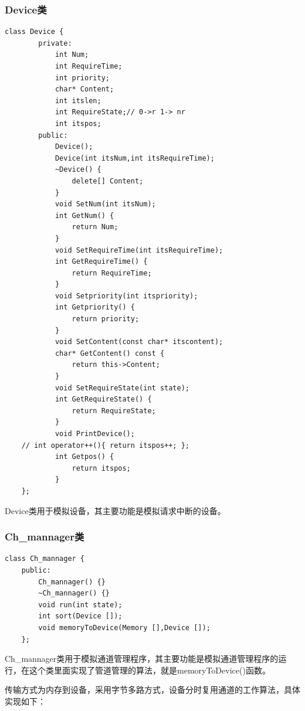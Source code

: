 \documentclass[UTF8,12pt]{article}
\begin{document}
\subsubsection{Device类}
\begin{lstlisting}[frame=shadowbox] 
    class Device {
        private:
            int Num;
            int RequireTime;
            int priority;
            char* Content;
            int itslen;
            int RequireState;// 0->r 1-> nr
            int itspos;
        public:
            Device();
            Device(int itsNum,int itsRequireTime);
            ~Device() {
                delete[] Content;
            }
            void SetNum(int itsNum);
            int GetNum() {
                return Num;
            }
            void SetRequireTime(int itsRequireTime);
            int GetRequireTime() {
                return RequireTime;
            }
            void Setpriority(int itspriority);
            int Getpriority() {
                return priority;
            }
            void SetContent(const char* itscontent);
            char* GetContent() const {
                return this->Content;
            }
            void SetRequireState(int state);
            int GetRequireState() {
                return RequireState;
            }
            void PrintDevice();
    // int operator++(){ return itspos++; };
            int Getpos() {
                return itspos;
            }
    };
\end{lstlisting}

Device类用于模拟设备，其主要功能是模拟请求中断的设备。

\subsubsection{Ch\_mannager类}
\begin{lstlisting}[frame=shadowbox]
    class Ch_mannager {
	public:
		Ch_mannager() {}
		~Ch_mannager() {}
		void run(int state);
		int sort(Device []);
		void memoryToDevice(Memory [],Device []);
    };
\end{lstlisting}

Ch\_mannager类用于模拟通道管理程序，其主要功能是模拟通道管理程序的运行，在这个类里面实现了管道管理的算法，就是memoryToDevice()函数。

传输方式为内存到设备，采用字节多路方式，设备分时复用通道的工作算法，具体实现如下：
\end{document}
